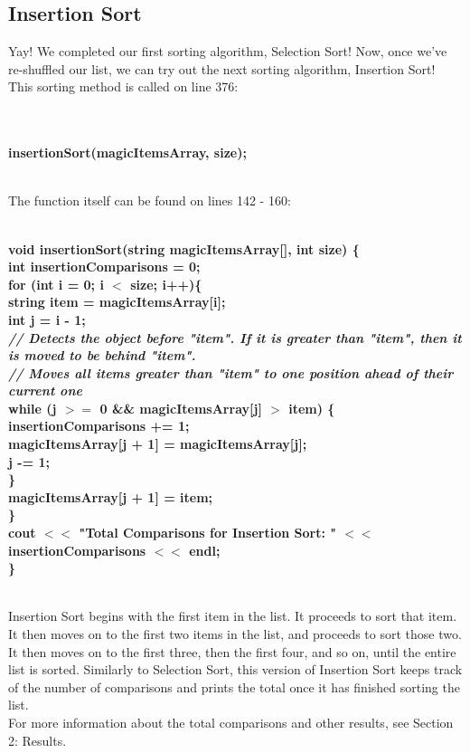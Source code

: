 \documentclass{article}
\begin{document}
\subsection{Insertion Sort}
Yay! We completed our first sorting algorithm, Selection Sort! Now, once we've re-shuffled our list, we can try out the next sorting algorithm, Insertion Sort! This sorting method is called on line 376: 

\textbf{
\\~\\ \indent insertionSort(magicItemsArray, size);\\~\\ }

The function itself can be found on lines 142 - 160:

\textbf{
\\ void insertionSort(string magicItemsArray[], int size) \{\\
    \indent int insertionComparisons = 0;\\
    \indent for (int i = 0; i $<$ size; i++)\{\\
        \indent \indent string item = magicItemsArray[i];\\
        \indent \indent int j = i - 1;\\
        \textit{ \indent \indent // Detects the object before "item". If it is greater than "item", then it is moved to be behind "item".\\
        \indent \indent // Moves all items greater than "item" to one position ahead of their current one\\ }
        \indent \indent while (j $>=$ 0 \&\& magicItemsArray[j] $>$ item) \{\\
            \indent \indent \indent insertionComparisons += 1;\\
            \indent \indent \indent magicItemsArray[j + 1] = magicItemsArray[j];\\
            \indent \indent \indent j -= 1;\\
        \indent \indent \}\\
        \indent \indent magicItemsArray[j + 1] = item;\\
    \indent \}\\
    \indent cout $<<$ "Total Comparisons for Insertion Sort: " $<<$ insertionComparisons $<<$ endl;\\
\}\\~\\ }

Insertion Sort begins with the first item in the list. It proceeds to sort that item. It then moves on to the first two items in the list, and proceeds to sort those two. It then moves on to the first three, then the first four, and so on, until the entire list is sorted. Similarly to Selection Sort, this version of Insertion Sort keeps track of the number of comparisons and prints the total once it has finished sorting the list. 
\\For more information about the total comparisons and other results, see Section 2: Results.
\end{document}
